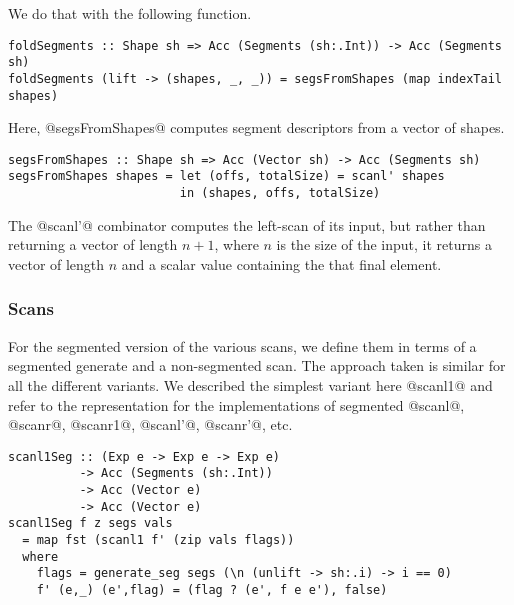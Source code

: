 %
We do that with the following function.
%
\begin{lstlisting}
foldSegments :: Shape sh => Acc (Segments (sh:.Int)) -> Acc (Segments sh)
foldSegments (lift -> (shapes, _, _)) = segsFromShapes (map indexTail shapes)
\end{lstlisting}
%
Here, @segsFromShapes@ computes segment descriptors from a vector of shapes.
%
\begin{lstlisting}
segsFromShapes :: Shape sh => Acc (Vector sh) -> Acc (Segments sh)
segsFromShapes shapes = let (offs, totalSize) = scanl' shapes
                        in (shapes, offs, totalSize)
\end{lstlisting}
%
The @scanl'@ combinator computes the left-scan of its input, but rather than returning a vector of length $n+1$, where $n$ is the size of the input, it returns a vector of length $n$ and a scalar value containing the that final element.

\subsubsection{Scans}

For the segmented version of the various scans, we define them in terms of a segmented generate and a non-segmented scan. The approach taken is similar for all the different variants. We described the simplest variant here @scanl1@ and refer to the representation for the implementations of segmented @scanl@, @scanr@, @scanr1@, @scanl'@, @scanr'@, etc.
%
\begin{lstlisting}
scanl1Seg :: (Exp e -> Exp e -> Exp e)
          -> Acc (Segments (sh:.Int))
          -> Acc (Vector e)
          -> Acc (Vector e)
scanl1Seg f z segs vals
  = map fst (scanl1 f' (zip vals flags))
  where
    flags = generate_seg segs (\n (unlift -> sh:.i) -> i == 0)
    f' (e,_) (e',flag) = (flag ? (e', f e e'), false)
\end{lstlisting}
%


